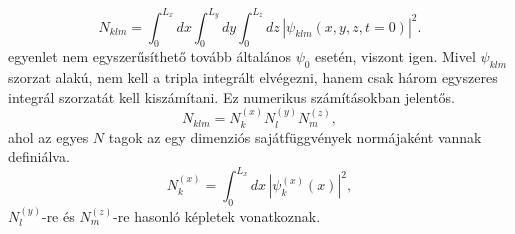 \begin{equation}
	N_{klm} = \int_0^{L_x}dx\int_0^{L_y}dy\int_0^{L_z}dz\,|\psi_{klm}(x,y,z,t=0)|^2.
	\label{3dbox:3norm}
\end{equation}
 egyenlet nem egyszerűsíthető tovább általános $\psi_0$ esetén, viszont  igen. Mivel $\psi_{klm}$ szorzat alakú, nem kell a tripla integrált elvégezni, hanem csak három egyszeres integrál szorzatát kell kiszámítani. Ez numerikus számításokban jelentős.
\begin{equation}
	N_{klm} = N^{(x)}_kN^{(y)}_lN^{(z)}_m,
\end{equation}
ahol az egyes $N$ tagok az egy dimenziós sajátfüggvények normájaként vannak definiálva.
\begin{equation}
	N^{(x)}_k = \int_0^{L_x}dx\,\left|\psi^{(x)}_k(x)\right|^2,
\end{equation}
$N^{(y)}_l$-re és $N^{(z)}_m$-re hasonló képletek vonatkoznak. 



%    
%    
%    
